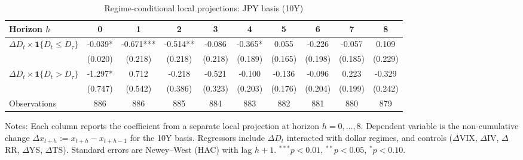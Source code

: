 \begin{table}[!htbp]\centering
\caption{Regime-conditional local projections: JPY basis (10Y)}
\label{tab:lp_jpy_10y}
\begin{tabular}{lccccccccc}
\toprule
Horizon $h$ & 0 & 1 & 2 & 3 & 4 & 5 & 6 & 7 & 8 \\
\midrule
$\Delta D_t \times \mathbf{1}\{D_t \le D_\tau\}$ & -0.039* & -0.671*** & -0.514** & -0.086 & -0.365* & 0.055 & -0.226 & -0.057 & 0.109 \\
  & (0.020) & (0.218) & (0.218) & (0.218) & (0.189) & (0.165) & (0.198) & (0.185) & (0.229) \\
$\Delta D_t \times \mathbf{1}\{D_t > D_\tau\}$ & -1.297* & 0.712 & -0.218 & -0.521 & -0.100 & -0.136 & -0.096 & 0.223 & -0.329 \\
  & (0.747) & (0.542) & (0.386) & (0.323) & (0.203) & (0.176) & (0.204) & (0.199) & (0.242) \\
\midrule
Observations & 886 & 886 & 885 & 884 & 883 & 882 & 881 & 880 & 879 \\
\bottomrule
\end{tabular}
\begin{flushleft}\footnotesize Notes: Each column reports the coefficient from a separate local projection at horizon $h=0,\dots,8$. Dependent variable is the non-cumulative change $\Delta x_{t+h}:=x_{t+h}-x_{t+h-1}$ for the 10Y basis. Regressors include $\Delta D_t$ interacted with dollar regimes, and controls ($\Delta$VIX, $\Delta$IV, $\Delta$RR, $\Delta$YS, $\Delta$TS). Standard errors are Newey--West (HAC) with lag $h+1$. $^{***}p<0.01$, $^{**}p<0.05$, $^{*}p<0.10$.\end{flushleft}
\end{table}